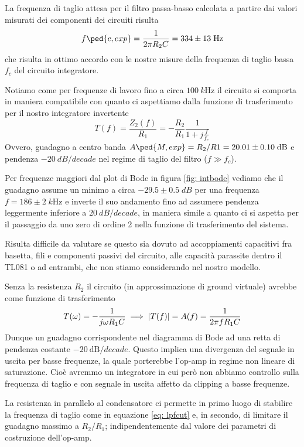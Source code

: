 \documentclass[10pt,a4paper]{article}
\begin{document}
La frequenza di taglio attesa per il filtro passa-basso calcolata a partire
dai valori misurati dei componenti dei circuiti risulta
\begin{equation}\label{eq: lpfcut}
f\ped{c, exp} = \frac{1}{2\pi R_2 C} = 334 \pm 13 \; \si{\Hz}
\end{equation}
che risulta in ottimo accordo con le nostre misure della frequenza di taglio
bassa $f_c$ del circuito integratore.

Notiamo come per frequenze di lavoro fino a circa $\SI{100}{k\Hz}$ il circuito
si comporta in maniera compatibile con quanto ci aspettiamo dalla funzione di
trasferimento per il nostro integratore invertente
\begin{equation}\label{eq: lpfTfunc}
T(f) = \frac{Z_2(f)}{R_1} = - \frac{R_2}{R_1} \frac{1}{1 + j \frac{f}{f_c}}
\end{equation}
Ovvero, guadagno a centro banda
$A\ped{M, exp} = R_2/R1 = 20.01 \pm 0.10 \; \si{dB}$ e pendenza
$\SI{-20}{dB/decade}$ nel regime di taglio del filtro ($f \gg f_c$).

Per frequenze maggiori dal plot di Bode in figura \ref{fig: intbode} vediamo
che il guadagno assume un minimo a circa $-29.5 \pm 0.5 \; \si{dB}$ per
una frequenza $f = 186 \pm 2 \; \si{k\Hz}$ e inverte il suo andamento fino
ad assumere pendenza leggermente inferiore a $\SI{20}{dB/decade}$, in maniera
simile a quanto ci si aspetta per il passaggio da uno zero di ordine 2
nella funzione di trasferimento del sistema.

Risulta difficile da valutare se questo sia dovuto ad accoppiamenti capacitivi
fra basetta, fili e componenti passivi del circuito, alle capacità parassite
dentro il TL081 o ad entrambi, che non stiamo considerando nel nostro modello.

Senza la resistenza $R_2$ il circuito (in approssimazione di ground virtuale)
avrebbe come funzione di trasferimento
\[
T(\omega) = - \frac{1}{j \omega R_1 C} \implies
\left| T(f) \right| = A(f) = \frac{1}{2\pi f R_1 C}
\]
Dunque un guadagno corrispondente nel diagramma di Bode ad una retta di
pendenza costante $\SI{-20}{\deci\bel/decade}$.
Questo implica una divergenza del segnale in uscita per basse frequenze, la
quale porterebbe l'op-amp in regime non lineare di saturazione.
Cioè avremmo un integratore in cui però non abbiamo controllo sulla
frequenza di taglio e con segnale in uscita affetto da clipping a basse
frequenze.

La resistenza in parallelo al condensatore ci permette in primo luogo di
stabilire la frequenza di taglio come in equazione \eqref{eq: lpfcut} e,
in secondo, di limitare il guadagno massimo a $R_2/R_1$;
indipendentemente dal valore dei parametri di costruzione dell'op-amp.
\end{document}
